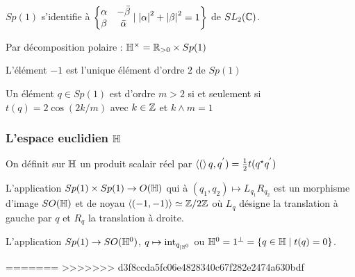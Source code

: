 \documentclass{cours}
\begin{document}
\begin{remark}
    $Sp(1)$ s'identifie à $\left\{\begin{matrix}\alpha & -\bar{\beta} \\ \beta & \bar{\alpha}\end{matrix}\mid \left|\alpha\right|^{2} + \left|\beta\right|^{2} = 1\right\}$ de $SL_{2}(\mathbb{C})$.
\end{remark}

\begin{proposition}
    Par décomposition polaire : $\mathbb{H}^{\times} = \mathbb{R}_{> 0} \times Sp(1)$
\end{proposition}

\begin{proposition}
    L'élément $-1$ est l'unique élément d'ordre $2$ de $Sp(1)$
\end{proposition}

\begin{proposition}
    Un élément $q \in Sp(1)$ est d'ordre $m > 2$ si et seulement si $t(q) = 2 \cos(2k / m)$ avec $k \in \mathbb{Z}$ et $k \wedge m = 1$
\end{proposition}

\subsubsection{L'espace euclidien $\mathbb{H}$}
\begin{definition}
    On définit sur $\mathbb{H}$ un produit scalair réel par $\left\langle ( \right\rangle q, q^{'}) = \frac{1}{2}t(q^{\star}q^{'})$
\end{definition}

\begin{proposition}
    L'application $Sp(1) \times Sp(1) \to O(\mathbb{H})$ qui à $\left(q_{1}, q_{2}\right) \mapsto L_{q_{1}}R_{q_{2}}$ est un morphisme d'image $SO(\mathbb{H})$ et de noyau $\left\langle (-1, -1) \right\rangle \simeq \mathbb{Z}/2\mathbb{Z}$ où $L_{q}$ désigne la translation à gauche par $q$ et $R_{q}$ la translation à droite. 
\end{proposition}

\begin{proposition}
    L'application $Sp(1) \rightarrow SO(\mathbb{H}^{0})$, $q\mapsto \text{int}_{q_{\mid\mathbb{H}^{0}}}$ ou $\mathbb{H}^{0} = 1^{\perp} = \left\{q \in \mathbb{H} \mid t(q) = 0\right\}$.
\end{proposition}
=======
>>>>>>> d3f8ccda5fc06e4828340c67f282e2474a630bdf
\end{document}

